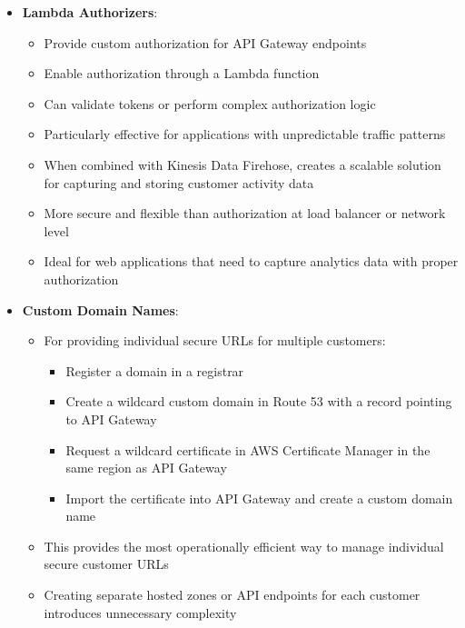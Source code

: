 \documentclass[11pt,a4paper]{report}
\begin{document}
\begin{itemize}
\begin{itemize}
  \item Use AWS Lambda functions to transform the data in transit
  \item Direct the Kinesis Data Firehose delivery stream to send data to Amazon S3
  \item Provides fully managed, real-time data processing with minimal operational overhead
\end{itemize}
  \item \textbf{Lambda Authorizers}:
\begin{itemize}
  \item Provide custom authorization for API Gateway endpoints
  \item Enable authorization through a Lambda function
  \item Can validate tokens or perform complex authorization logic
  \item Particularly effective for applications with unpredictable traffic patterns
  \item When combined with Kinesis Data Firehose, creates a scalable solution for capturing and storing customer activity data
  \item More secure and flexible than authorization at load balancer or network level
  \item Ideal for web applications that need to capture analytics data with proper authorization
\end{itemize}
  \item \textbf{Custom Domain Names}:
\begin{itemize}
  \item For providing individual secure URLs for multiple customers:
\begin{itemize}
  \item Register a domain in a registrar
  \item Create a wildcard custom domain in Route 53 with a record pointing to API Gateway
  \item Request a wildcard certificate in AWS Certificate Manager in the same region as API Gateway
  \item Import the certificate into API Gateway and create a custom domain name
\end{itemize}
  \item This provides the most operationally efficient way to manage individual secure customer URLs
  \item Creating separate hosted zones or API endpoints for each customer introduces unnecessary complexity
\end{itemize}

\end{itemize}
\end{document}
